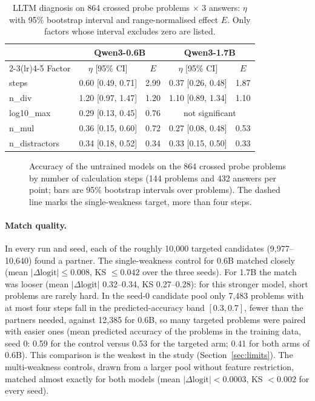 \documentclass[11pt]{article}
\begin{document}
\begin{table}[t]
\centering
\caption{LLTM diagnosis on 864 crossed probe problems $\times$ 3 answers: $\eta$ with 95\% bootstrap interval and
range-normalised effect $E$. Only factors whose interval excludes zero are listed.}
\label{tab:diag}
\begin{tabular}{lcccc}
\toprule
& \multicolumn{2}{c}{Qwen3-0.6B} & \multicolumn{2}{c}{Qwen3-1.7B} \\
\cmidrule(lr){2-3}\cmidrule(lr){4-5}
Factor & $\eta$ [95\% CI] & $E$ & $\eta$ [95\% CI] & $E$ \\
\midrule
steps          & 0.60 [0.49, 0.71] & 2.99 & 0.37 [0.26, 0.48] & 1.87 \\
n\_div         & 1.20 [0.97, 1.47] & 1.20 & 1.10 [0.89, 1.34] & 1.10 \\
log10\_max     & 0.29 [0.13, 0.45] & 0.76 & \multicolumn{2}{c}{not significant} \\
n\_mul         & 0.36 [0.15, 0.60] & 0.72 & 0.27 [0.08, 0.48] & 0.53 \\
n\_distractors & 0.34 [0.18, 0.52] & 0.34 & 0.33 [0.15, 0.50] & 0.33 \\
\bottomrule
\end{tabular}
\end{table}

\begin{figure}[t]
\centering

\caption{Accuracy of the untrained models on the 864 crossed probe problems by number of calculation steps (144
problems and 432 answers per point; bars are 95\% bootstrap intervals over problems). The dashed line marks the
single-weakness target, more than four steps.}
\label{fig:steps}
\end{figure}

\paragraph{Match quality.} In every run and seed, each of the roughly 10{,}000 targeted candidates (9{,}977--10{,}640)
found a partner. The single-weakness control for 0.6B matched closely (mean $|\Delta\text{logit}| \le 0.008$, KS $\le 0.042$
over the three seeds). For 1.7B the match was looser (mean $|\Delta\text{logit}|$ 0.32--0.34, KS 0.27--0.28): for this
stronger model, short problems are rarely hard. In the seed-0 candidate pool only 7{,}483 problems with at most four
steps fall in the predicted-accuracy band $[0.3, 0.7]$, fewer than the partners needed, against 12{,}385 for 0.6B, so
many targeted problems were paired with easier ones (mean predicted accuracy of the problems in the training data,
seed 0: 0.59 for the control versus 0.53 for the targeted arm; 0.41 for both arms of 0.6B). This comparison is the weakest in the study (Section~\ref{sec:limits}). The
multi-weakness controls, drawn from a larger pool without feature restriction, matched almost exactly for both models
(mean $|\Delta\text{logit}| < 0.0003$, KS $< 0.002$ for every seed).
\end{document}
